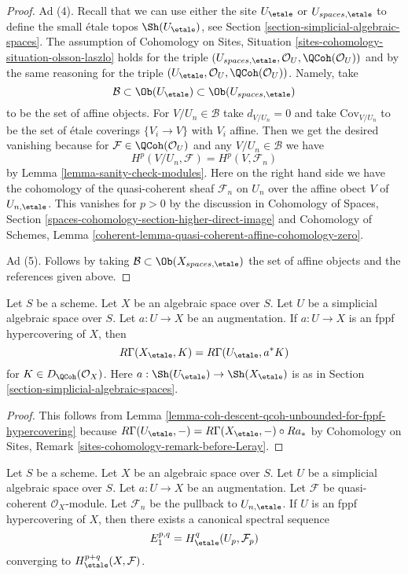 \begin{proof}
\medskip\noindent
Ad (4). Recall that we can use either the site $U_\etale$ or
$U_{spaces, \etale}$ to define the small \'etale topos
$\Sh(U_\etale)$, see Section \ref{section-simplicial-algebraic-spaces}.
The assumption of
Cohomology on Sites, Situation \ref{sites-cohomology-situation-olsson-laszlo}
holds for the triple
$(U_{spaces, \etale}, \mathcal{O}_U, \QCoh(\mathcal{O}_U))$
and by the same reasoning for the triple
$(U_\etale, \mathcal{O}_U, \QCoh(\mathcal{O}_U))$.
Namely, take
$$
\mathcal{B} \subset \Ob(U_\etale) \subset \Ob(U_{spaces, \etale})
$$
to be the set of affine objects. For $V/U_n \in \mathcal{B}$
take $d_{V/U_n} = 0$ and take $\text{Cov}_{V/U_n}$ to be the set of
\'etale coverings $\{V_i \to V\}$ with $V_i$ affine.
Then we get the desired vanishing because for
$\mathcal{F} \in \QCoh(\mathcal{O}_U)$
and any $V/U_n \in \mathcal{B}$ we have
$$
H^p(V/U_n, \mathcal{F}) = H^p(V, \mathcal{F}_n)
$$
by Lemma \ref{lemma-sanity-check-modules}. Here on the
right hand side we have the cohomology of the quasi-coherent
sheaf $\mathcal{F}_n$ on $U_n$ over the affine obect $V$
of $U_{n, \etale}$. This vanishes for $p > 0$ by the discussion in
Cohomology of Spaces, Section
\ref{spaces-cohomology-section-higher-direct-image} and
Cohomology of Schemes, Lemma
\ref{coherent-lemma-quasi-coherent-affine-cohomology-zero}.

\medskip\noindent
Ad (5). Follows by taking $\mathcal{B} \subset \Ob(X_{spaces, \etale})$
the set of affine objects and the references given above.
\end{proof}

\begin{lemma}
\label{lemma-compute-via-fppf-hypercovering-modules}
Let $S$ be a scheme. Let $X$ be an algebraic space over $S$.
Let $U$ be a simplicial algebraic space over $S$. Let $a : U \to X$
be an augmentation. If $a : U \to X$ is an fppf hypercovering of $X$, then
$$
R\Gamma(X_\etale, K) = R\Gamma(U_\etale, a^*K)
$$
for $K \in D_\QCoh(\mathcal{O}_X)$. Here $a : \Sh(U_\etale) \to \Sh(X_\etale)$
is as in Section \ref{section-simplicial-algebraic-spaces}.
\end{lemma}

\begin{proof}
This follows from
Lemma \ref{lemma-coh-descent-qcoh-unbounded-for-fppf-hypercovering}
because $R\Gamma(U_\etale, -) = R\Gamma(X_\etale, -) \circ Ra_*$ by
Cohomology on Sites, Remark \ref{sites-cohomology-remark-before-Leray}.
\end{proof}

\begin{lemma}
\label{lemma-spectral-sequence-fppf-hypercovering-modules}
Let $S$ be a scheme. Let $X$ be an algebraic space over $S$.
Let $U$ be a simplicial algebraic space over $S$. Let $a : U \to X$
be an augmentation. Let $\mathcal{F}$ be quasi-coherent
$\mathcal{O}_X$-module. Let $\mathcal{F}_n$ be the pullback to
$U_{n, \etale}$. If $U$ is an fppf hypercovering of $X$, then
there exists a canonical spectral sequence
$$
E_1^{p, q} = H^q_\etale(U_p, \mathcal{F}_p)
$$
converging to $H^{p + q}_\etale(X, \mathcal{F})$.
\end{lemma}

